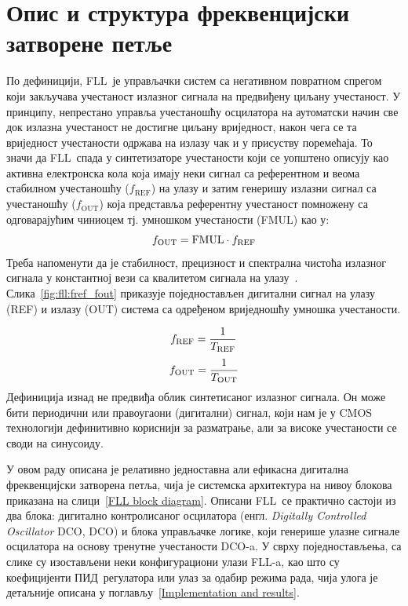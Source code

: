 \documentclass[master]{finthesis}
\makeatletter
\newcommand*{\engl}[2][\@empty]{%
    \edef\theacronym{#1}%
    (енгл. \foreignlanguage{english}{\emph{#2}%
    \ifx\theacronym\@empty \else , #1\fi})%
}
\def \FLL  {FLL} %
\def \DCO  {DCO} %
\def \PID  {ПИД} %
\makeatother
\begin{document}
\section{Опис и структура фреквенцијски затворене петље} \label{FLL structure}
По дефиницији, \FLL\ је управљачки систем са негативном повратном спрегом који закључава учестаност излазног сигнала на предвиђену циљану учестаност. У принципу, непрестано управља учестаношћу осцилатора на аутоматски начин све док излазна учестаност не достигне циљану вриједност, након чега се та вриједност учестаности одржава на излазу чак и у присуству поремећаја. То значи да \FLL\ спада у синтетизаторе учестаности који се уопштено описују као активна електронска кола која имају неки сигнал са референтном и веома стабилном учестаношћу ($f_\text{REF}$) на улазу и затим генеришу излазни сигнал са учестаношћу ($f_\text{OUT}$) која представља референтну учестаност помножену са одговарајућим чиниоцем тј. умношком учестаности (FMUL) као у:
\begin{equation}
	\label{eq:fll:fout}
	f_\text{OUT} = \text{FMUL} \cdot f_\text{REF}
        \vspace{0.3cm}
\end{equation}
Треба напоменути да је стабилност, прецизност и спектрална чистоћа излазног сигнала у константној вези са квалитетом сигнала на улазу~\cite{Staszewski:FREQUENCY_SYNTHESIZER_CMOS_2005}. Слика~\ref{fig:fll:fref_fout} приказује поједностављен дигитални сигнал на улазу (REF) и излазу (OUT) система са одређеном вриједношћу умношка учестаности. \par

\begin{equation}
	f_\text{REF} = \frac{1}{T_\text{REF}}
        \vspace{0.2cm}
\end{equation}
\begin{equation}
	f_\text{OUT} = \frac{1}{T_\text{OUT}}
        \vspace{0.3cm}
\end{equation}
Дефиниција изнад не предвиђа облик синтетисаног излазног сигнала. Он може бити периодични или правоугаони (дигитални) сигнал, који нам је у CMOS технологији дефинитивно кориснији за разматрање, али за високе учестаности се своди на синусоиду. \par 
У овом раду описана је релативно једноставна али ефикасна дигитална фреквенцијски затворена петља, чија је системска архитектура на нивоу блокова приказана на слици~\ref{FLL block diagram}. Описани \FLL\ се практично састоји из два блока: дигитално контролисаног осцилатора \engl[DCO]{Digitally Controlled Oscillator} и блока управљачке логике, који генерише улазне сигнале осцилатора на основу тренутне учестаности \DCO-a. У сврху поједностављења, са слике су изостављени неки конфигурациони улази \FLL-a, као што су коефицијенти \PID\ регулатора или улаз за одабир режима рада, чија улога је детаљније описана у поглављу~\ref{Implementation and results}. \par
\end{document}
